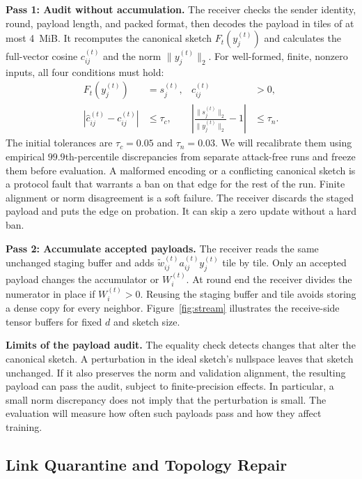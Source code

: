 \documentclass{article}
\begin{document}
\textbf{Pass 1: Audit without accumulation.} The receiver checks the sender identity, round, payload length, and packed format, then decodes the payload in tiles of at most 4~MiB. It recomputes the canonical sketch $F_t(y_j^{(t)})$ and calculates the full-vector cosine $c_{ij}^{(t)}$ and the norm $\|y_j^{(t)}\|_2$. For well-formed, finite, nonzero inputs, all four conditions must hold:
\begin{equation}
\begin{aligned}
  F_t(y_j^{(t)}) &= s_j^{(t)}, & c_{ij}^{(t)} &> 0, \\
  |\widehat c_{ij}^{(t)}-c_{ij}^{(t)}| &\le \tau_c, &
  \left|\frac{\|s_j^{(t)}\|_2}{\|y_j^{(t)}\|_2}-1\right| &\le \tau_n .
\end{aligned}
\label{eq:audit}
\end{equation}
The initial tolerances are $\tau_c=0.05$ and $\tau_n=0.03$. We will recalibrate them using empirical $99.9$th-percentile discrepancies from separate attack-free runs and freeze them before evaluation. A malformed encoding or a conflicting canonical sketch is a protocol fault that warrants a ban on that edge for the rest of the run. Finite alignment or norm disagreement is a soft failure. The receiver discards the staged payload and puts the edge on probation. It can skip a zero update without a hard ban.

\textbf{Pass 2: Accumulate accepted payloads.} The receiver reads the same unchanged staging buffer and adds $\widetilde w_{ij}^{(t)} a_{ij}^{(t)}y_j^{(t)}$ tile by tile. Only an accepted payload changes the accumulator or $W_i^{(t)}$. At round end the receiver divides the numerator in place if $W_i^{(t)}>0$. Reusing the staging buffer and tile avoids storing a dense copy for every neighbor. Figure~\ref{fig:stream} illustrates the receive-side tensor buffers for fixed $d$ and sketch size.

\textbf{Limits of the payload audit.} The equality check detects changes that alter the canonical sketch. A perturbation in the ideal sketch's nullspace leaves that sketch unchanged. If it also preserves the norm and validation alignment, the resulting payload can pass the audit, subject to finite-precision effects. In particular, a small norm discrepancy does not imply that the perturbation is small. The evaluation will measure how often such payloads pass and how they affect training.

\subsection{Link Quarantine and Topology Repair}
\label{sec:quarantine}
\end{document}
